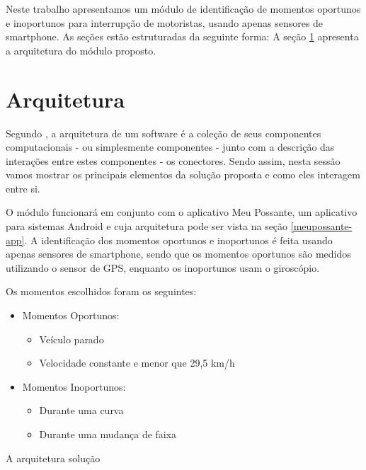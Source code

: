 \label{solucao}

Neste trabalho apresentamos um módulo de identificação de momentos oportunos e inoportunos para interrupção de
motoristas, usando apenas sensores de smartphone. As seções estão estruturadas da seguinte forma: A seção
\ref{sec-arquitetura-solucao} apresenta a arquitetura do módulo proposto.

\section{Arquitetura}
\label{sec-arquitetura-solucao}
Segundo , a arquitetura de um software é a coleção de seus componentes computacionais - ou simplesmente
componentes - junto com a descrição das interações entre estes componentes - os conectores.  Sendo assim, nesta sessão
vamos mostrar os principais elementos da solução proposta e como eles interagem entre si.

O módulo funcionará em conjunto com o aplicativo Meu Possante, um aplicativo para sistemas Android e cuja arquitetura pode ser vista
na seção \ref{meupossante-app}. A identificação dos momentos oportunos e inoportunos é feita usando apenas sensores de smartphone,
sendo que os momentos oportunos são medidos utilizando o sensor de GPS, enquanto os inoportunos usam o giroscópio.

Os momentos escolhidos foram os seguintes:

\begin{itemize}
  \item Momentos Oportunos:
    \begin{itemize}
      \item Veículo parado \cite{kim2015sensors}
      \item Velocidade constante e menor que 29,5 km/h \cite{kim2015sensors}
    \end{itemize}
  \item Momentos Inoportunos:
    \begin{itemize}
      \item Durante uma curva \cite{monk2004recovering}
      \item Durante uma mudança de faixa \cite{monk2004recovering}
    \end{itemize}
\end{itemize}

A arquitetura solução 
